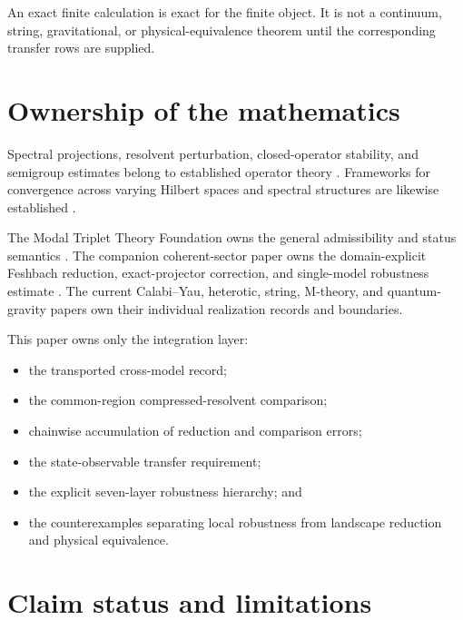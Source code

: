 \documentclass[11pt]{article}
\theoremstyle{definition}
\theoremstyle{remark}
\newcommand{\1}{\mathbf 1}
\newcommand{\MTT}{Modal Triplet Theory}
\begin{document}
An exact finite calculation is exact for the finite object.  It is not a
continuum, string, gravitational, or physical-equivalence theorem until
the corresponding transfer rows are supplied.

\section{Ownership of the mathematics}
\label{sec:ownership}

Spectral projections, resolvent perturbation, closed-operator stability,
and semigroup estimates belong to established operator theory
\cite{Kato1995,DavisKahan1970}.  Frameworks for convergence across varying
Hilbert spaces and spectral structures are likewise established
\cite{KuwaeShioya2003,Post2012}.

The \MTT{} Foundation owns the general admissibility and status semantics
\cite{MTTFoundation2026}.  The companion coherent-sector paper owns the
domain-explicit Feshbach reduction, exact-projector correction, and
single-model robustness estimate \cite{MTTCoherentReduction2026}.  The
current Calabi--Yau, heterotic, string, M-theory, and quantum-gravity papers
own their individual realization records and boundaries.

This paper owns only the integration layer:
\begin{itemize}[leftmargin=2em]
\item the transported cross-model record;
\item the common-region compressed-resolvent comparison;
\item chainwise accumulation of reduction and comparison errors;
\item the state-observable transfer requirement;
\item the explicit seven-layer robustness hierarchy; and
\item the counterexamples separating local robustness from landscape
      reduction and physical equivalence.
\end{itemize}

\section{Claim status and limitations}
\label{sec:status}
\end{document}
